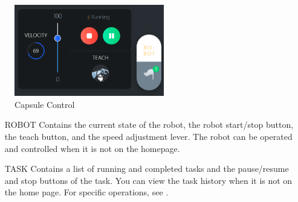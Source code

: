 \begin{figure}[hb]
	\centering
	\includegraphics[height=4cm]{en/image/2-18.png}
	\caption{Capsule Control}
	\label{fig:胶囊控制区}
\end{figure}

\begin{itemize}[leftmargin=4.5em]
	\item [ROBOT] Contains the current state of the robot, the robot start/stop button, the teach button, and the speed adjustment lever. The robot can be operated and controlled when it is not on the homepage.
	\item [TASK] Contains a list of running and completed tasks and the pause/resume and stop buttons of the task. You can view the task history when it is not on the home page. For specific operations, see .
\end{itemize}
